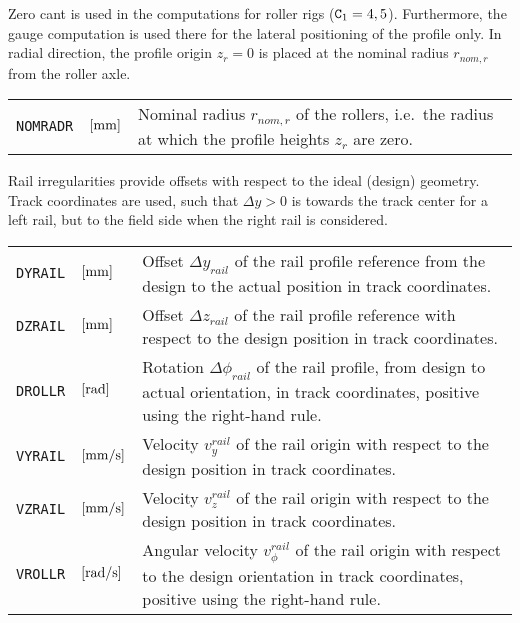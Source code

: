 \documentclass[12pt]{report}
\renewcommand{\magenta}[1]{}
\newenvironment{inputvars}{\vspace{0.4\baselineskip}%

\begin{tabular}{>{\raggedright}p{22mm}p{19mm}p{113mm}}}{
\end{tabular}

}
\newcommand{\inpvar}[3]{{\small\tt #1} & $#2$ & #3 \\[1ex]}
\begin{document}
Zero cant is used in the computations for roller rigs (${\tt C}_1=4,5$).
Furthermore, the gauge computation is used there for the lateral
positioning of the profile only. In radial direction, the profile origin
$z_r=0$ is placed at the nominal radius $r_{nom,r}$ from the roller axle.
\begin{inputvars}
\inpvar{NOMRADR}{\bunit{mm}}{Nominal radius $r_{nom,r}$ of the rollers, i.e.\ the
        radius at which the profile heights $z_r$ are zero.}
\end{inputvars}

Rail irregularities provide offsets with respect to the ideal (design)
geometry. Track coordinates are used, such that $\Delta y>0$ is towards
the track center for a left rail, but to the field side when the right rail
is considered.
\begin{inputvars}
\inpvar{DYRAIL}{\bunit{mm}}{Offset $\Delta y_{rail}$ of the rail profile
        reference from the design to the actual position in track coordinates.}
\inpvar{DZRAIL}{\bunit{mm}}{Offset $\Delta z_{rail}$ of the rail profile
        reference with respect to the design position in track coordinates.}
\inpvar{DROLLR}{\bunit{rad}}{Rotation $\Delta \phi_{rail}$ of the rail profile,
        from design to actual orientation, in track coordinates,
        positive using the right-hand rule.}
\inpvar{VYRAIL}{\bunit{mm/s}}{Velocity $v_y^{rail}$ of the rail origin with
        respect to the design position in track coordinates.}
\inpvar{VZRAIL}{\bunit{mm/s}}{Velocity $v_z^{rail}$ of the rail origin with
        respect to the design position in track coordinates.}
\inpvar{VROLLR}{\bunit{rad/s}}{Angular velocity $v_\phi^{rail}$ of the rail
        origin with respect to the design orientation in track coordinates,
        positive using the right-hand rule.}
\end{inputvars}

\magenta{
The massless rail model of Equation (\ref{eq:cntc_defl}) is activated using
control digit ${\tt F}_1=3$, and takes the following inputs:
\begin{inputvars}
\inpvar{KYRAIL}{\bunit{N/mm}}{Effective lateral rail stiffness $k^*_y$.}
\inpvar{FYRAIL}{\bunit{N}}{Lateral spring force $F_y^*$ from ground on rail
        at zero deflection.}
\inpvar{KZRAIL}{\bunit{N/mm}}{Effective vertical rail stiffness $k^*_z$.}
\inpvar{FZRAIL}{\bunit{N}}{Vertical spring force $F_z^*$ from ground on
        rail at zero deflection.}
\end{inputvars}
}
 
\end{document}
